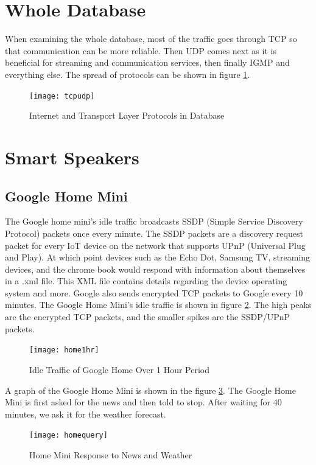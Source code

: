 \section{Whole Database}
\label{wholeDB}
When examining the whole database, most of the traffic goes through TCP so that communication can be more reliable. Then UDP comes next as it is beneficial for streaming and communication services, then finally IGMP and everything else. The spread of protocols can be shown in figure \ref{fig:tcpudp}.

\label{Whole Database}
\begin{figure}[H]
  \centering
    \texttt{[image: tcpudp]}
  \caption{Internet and Transport Layer Protocols in Database}
  \label{fig:tcpudp}
\end{figure}

\section{Smart Speakers}
\label{smartSpeakerResults}
\subsection{Google Home Mini}
The Google home mini's idle traffic broadcasts SSDP (Simple Service Discovery Protocol) packets once every minute. The SSDP packets are a discovery request packet for every IoT device on the network that supports UPnP (Universal Plug and Play). At which point devices such as the Echo Dot, Samsung TV, streaming devices, and the chrome book would respond with information about themselves in a .xml file. This XML file contains details regarding the device operating system and more. Google also sends encrypted TCP packets to Google every 10 minutes. The Google Home Mini's idle traffic is shown in figure \ref{fig:home}. The high peaks are the encrypted TCP packets, and the smaller spikes are the SSDP/UPnP packets.

\begin{figure}[H]
  \centering
    \texttt{[image: home1hr]}
  \caption{Idle Traffic of Google Home Over 1 Hour Period}
  \label{fig:home}
\end{figure}

A graph of the Google Home Mini is shown in the figure \ref{fig:homequery}. The Google Home Mini is first asked for the news and then told to stop. After waiting for 40 minutes, we ask it for the weather forecast.

\begin{figure}[H]
  \centering
    \texttt{[image: homequery]}
  \caption{Home Mini Response to News and Weather}
  \label{fig:homequery}
\end{figure}

